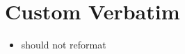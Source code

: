 \documentclass{article}
\newenvironment{myverbatim}{\verbatim}{\endverbatim}
\begin{document}
\section{Custom Verbatim}
\begin{myverbatim}
\begin{itemize}
\item should not reformat
\end{itemize}
\end{myverbatim}
\end{document}
